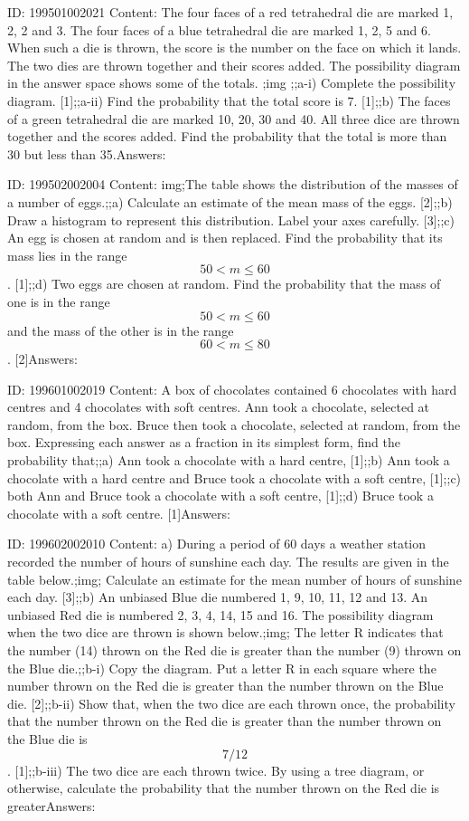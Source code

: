 \documentclass{article}
\begin{document}
ID: 199501002021
Content:
The four faces of a red tetrahedral die are marked 1, 2, 2 and 3. The four faces of a blue tetrahedral die are marked 1, 2, 5 and 6. When such a die is thrown, the score is the number on the face on which it lands. The two dies are thrown together and their scores added. The possibility diagram in the answer space shows some of the totals. ;img ;;a-i) Complete the possibility diagram. [1];;a-ii) Find the probability that the total score is 7. [1];;b) The faces of a green tetrahedral die are marked 10, 20, 30 and 40. All three dice are thrown together and the scores added. Find the probability that the total is more than 30 but less than 35.Answers:

ID: 199502002004
Content:
img;The table shows the distribution of the masses of a number of eggs.;;a) Calculate an estimate of the mean mass of the eggs. [2];;b) Draw a histogram to represent this distribution. Label your axes carefully. [3];;c) An egg is chosen at random and is then replaced. Find the probability that its mass lies in the range$$50 < m \leq 60$$. [1];;d) Two eggs are chosen at random. Find the probability that the mass of one is in the range $$50 < m \leq 60$$ and the mass of the other is in the range $$60 < m \leq 80$$. [2]Answers:

ID: 199601002019
Content:
A box of chocolates contained 6 chocolates with hard centres and 4 chocolates with soft centres. Ann took a chocolate, selected at random, from the box. Bruce then took a chocolate, selected at random, from the box. Expressing each answer as a fraction in its simplest form, find the probability that;;a) Ann took a chocolate with a hard centre, [1];;b) Ann took a chocolate with a hard centre and Bruce took a chocolate with a soft centre, [1];;c) both Ann and Bruce took a chocolate with a soft centre, [1];;d) Bruce took a chocolate with a soft centre. [1]Answers:

ID: 199602002010
Content:
a) During a period of 60 days a weather station recorded the number of hours of sunshine each day. The results are given in the table below.;img; Calculate an estimate for the mean number of hours of sunshine each day. [3];;b) An unbiased Blue die numbered 1, 9, 10, 11, 12 and 13. An unbiased Red die is numbered 2, 3, 4, 14, 15 and 16. The possibility diagram when the two dice are thrown is shown below.;img; The letter R indicates that the number (14) thrown on the Red die is greater than the number (9) thrown on the Blue die.;;b-i) Copy the diagram. Put a letter R in each square where the number thrown on the Red die is greater than the number thrown on the Blue die. [2];;b-ii) Show that, when the two dice are each thrown once, the probability that the number thrown on the Red die is greater than the number thrown on the Blue die is $$7/12$$. [1];;b-iii) The two dice are each thrown twice. By using a tree diagram, or otherwise, calculate the probability that the number thrown on the Red die is greaterAnswers:
\end{document}
